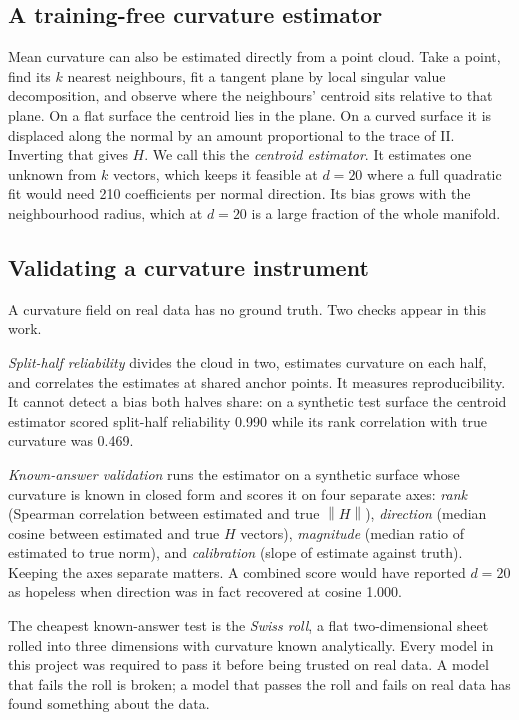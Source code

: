 \documentclass[11pt,a4paper]{article}
\newcommand{\norm}[1]{\left\lVert #1 \right\rVert}
\begin{document}
\subsection{A training-free curvature estimator}

Mean curvature can also be estimated directly from a point cloud. Take a point, find its $k$ nearest neighbours, fit a tangent plane by local singular value decomposition, and observe where the neighbours' centroid sits relative to that plane. On a flat surface the centroid lies in the plane. On a curved surface it is displaced along the normal by an amount proportional to the trace of $\mathrm{II}$. Inverting that gives $H$. We call this the \emph{centroid estimator}. It estimates one unknown from $k$ vectors, which keeps it feasible at $d = 20$ where a full quadratic fit would need 210 coefficients per normal direction. Its bias grows with the neighbourhood radius, which at $d = 20$ is a large fraction of the whole manifold.

\subsection{Validating a curvature instrument}

A curvature field on real data has no ground truth. Two checks appear in this work.

\emph{Split-half reliability} divides the cloud in two, estimates curvature on each half, and correlates the estimates at shared anchor points. It measures reproducibility. It cannot detect a bias both halves share: on a synthetic test surface the centroid estimator scored split-half reliability 0.990 while its rank correlation with true curvature was 0.469.

\emph{Known-answer validation} runs the estimator on a synthetic surface whose curvature is known in closed form and scores it on four separate axes: \emph{rank} (Spearman correlation between estimated and true $\norm{H}$), \emph{direction} (median cosine between estimated and true $H$ vectors), \emph{magnitude} (median ratio of estimated to true norm), and \emph{calibration} (slope of estimate against truth). Keeping the axes separate matters. A combined score would have reported $d = 20$ as hopeless when direction was in fact recovered at cosine 1.000.

The cheapest known-answer test is the \emph{Swiss roll}, a flat two-dimensional sheet rolled into three dimensions with curvature known analytically. Every model in this project was required to pass it before being trusted on real data. A model that fails the roll is broken; a model that passes the roll and fails on real data has found something about the data.
\end{document}
